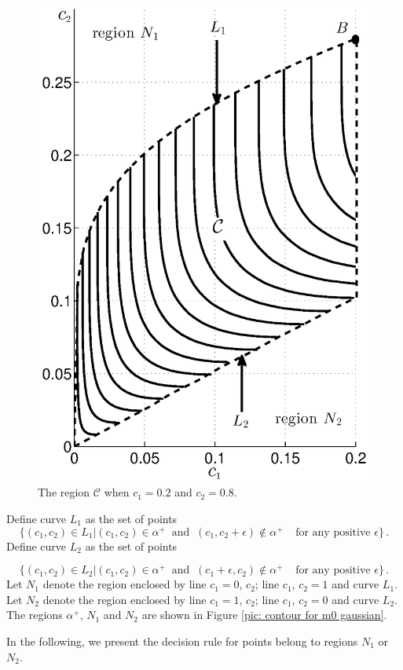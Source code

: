 \begin{figure}[!t]
\centering
\includegraphics[width=12cm, height = 16cm]{3/singlecontour2.eps}
\caption{The region $\mathcal{C}$ when $c_1 = 0.2$ and $c_2 = 0.8$.}
\label{pic: regionC}
\end{figure}

Define curve $L_1$ as the set of points 
\[
\{ (c_1, c_2) \in L_1 | (c_1, c_2) \in \alpha^+ \;\;\text{and} \;\;(c_1, c_2+\epsilon)\notin \alpha^+ \;\;\;\;\text{for any positive $\epsilon$} \}\,.
\]
Define curve $L_2$ as the set of points 

\[
\{ (c_1, c_2) \in L_2 | (c_1, c_2) \in \alpha^+ \;\;\text{and} \;\;(c_1 + \epsilon, c_2)\notin \alpha^+ \;\;\;\;\text{for any positive $\epsilon$} \}\,.
\]
Let $N_1$ denote the region enclosed by line $c_1 = 0$, $c_2$; line $c_1$, $c_2 = 1$ and curve $L_1$.
Let $N_2$ denote the region enclosed by line $c_1 = 1$, $c_2$; line $c_1$, $c_2 = 0$ and curve $L_2$.
The regions $\alpha^+$, $N_1$ and $N_2$ are shown in Figure \ref{pic: contour for m0 gaussian}.

In the following, we present the decision rule for points belong to regions $N_1$ or $N_2$.

